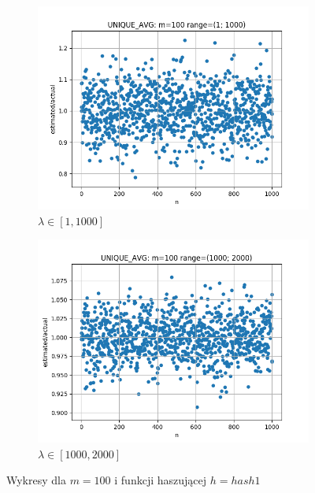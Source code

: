 \documentclass{article}
\begin{document}
\begin{figure}[H]
\begin{subfigure}{0.6\textwidth}
            \includegraphics[width=\linewidth]{avg/zad1_range_1_1000.png}
            \caption{$\lambda \in [1, 1000]$}
        \end{subfigure}
        \begin{subfigure}{0.6\textwidth}
            \centering
            \includegraphics[width=\linewidth]{avg/zad1_range_1000_2000.png}
            \caption{$\lambda \in [1000, 2000]$}
        \end{subfigure}
        \caption{Wykresy dla $m = 100$ i funkcji haszującej $h = hash1$}
    \end{figure}
\end{document}

